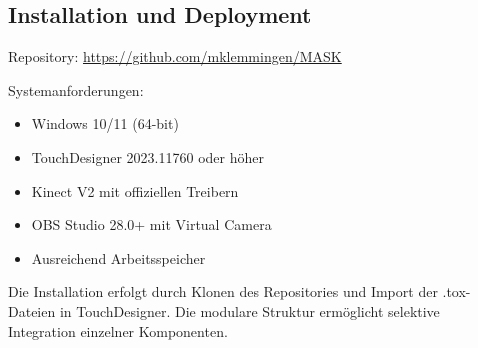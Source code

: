 \subsection*{Installation und Deployment}

Repository: \url{https://github.com/mklemmingen/MASK}

Systemanforderungen:
\begin{itemize}
    \item Windows 10/11 (64-bit)
    \item TouchDesigner 2023.11760 oder höher
    \item Kinect V2 mit offiziellen Treibern
    \item OBS Studio 28.0+ mit Virtual Camera
    \item Ausreichend Arbeitsspeicher
\end{itemize}

Die Installation erfolgt durch Klonen des Repositories und Import der .tox-Dateien in TouchDesigner. Die modulare Struktur ermöglicht selektive Integration einzelner Komponenten.
